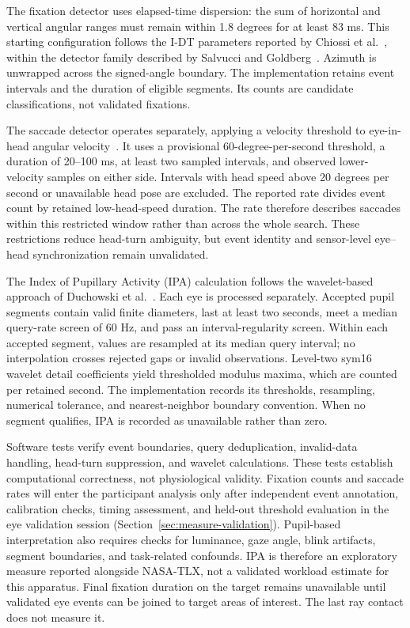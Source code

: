 The fixation detector uses elapsed-time dispersion: the sum of horizontal and vertical angular ranges must remain within 1.8 degrees for at least 83 ms. This starting configuration follows the I-DT parameters reported by Chiossi et al.~\cite{chiossi2024searching}, within the detector family described by Salvucci and Goldberg~\cite{salvucci2000fixations}. Azimuth is unwrapped across the signed-angle boundary. The implementation retains event intervals and the duration of eligible segments. Its counts are candidate classifications, not validated fixations.

The saccade detector operates separately, applying a velocity threshold to eye-in-head angular velocity~\cite{salvucci2000fixations}. It uses a provisional 60-degree-per-second threshold, a duration of 20--100 ms, at least two sampled intervals, and observed lower-velocity samples on either side. Intervals with head speed above 20 degrees per second or unavailable head pose are excluded. The reported rate divides event count by retained low-head-speed duration. The rate therefore describes saccades within this restricted window rather than across the whole search. These restrictions reduce head-turn ambiguity, but event identity and sensor-level eye--head synchronization remain unvalidated.

The Index of Pupillary Activity (IPA) calculation follows the wavelet-based approach of Duchowski et al.~\cite{duchowski2018ipa}. Each eye is processed separately. Accepted pupil segments contain valid finite diameters, last at least two seconds, meet a median query-rate screen of 60 Hz, and pass an interval-regularity screen. Within each accepted segment, values are resampled at its median query interval; no interpolation crosses rejected gaps or invalid observations. Level-two sym16 wavelet detail coefficients yield thresholded modulus maxima, which are counted per retained second. The implementation records its thresholds, resampling, numerical tolerance, and nearest-neighbor boundary convention. When no segment qualifies, IPA is recorded as unavailable rather than zero.

Software tests verify event boundaries, query deduplication, invalid-data handling, head-turn suppression, and wavelet calculations. These tests establish computational correctness, not physiological validity. Fixation counts and saccade rates will enter the participant analysis only after independent event annotation, calibration checks, timing assessment, and held-out threshold evaluation in the eye validation session (Section~\ref{sec:measure-validation}). Pupil-based interpretation also requires checks for luminance, gaze angle, blink artifacts, segment boundaries, and task-related confounds. IPA is therefore an exploratory measure reported alongside NASA-TLX, not a validated workload estimate for this apparatus. Final fixation duration on the target remains unavailable until validated eye events can be joined to target areas of interest. The last ray contact does not measure it.

